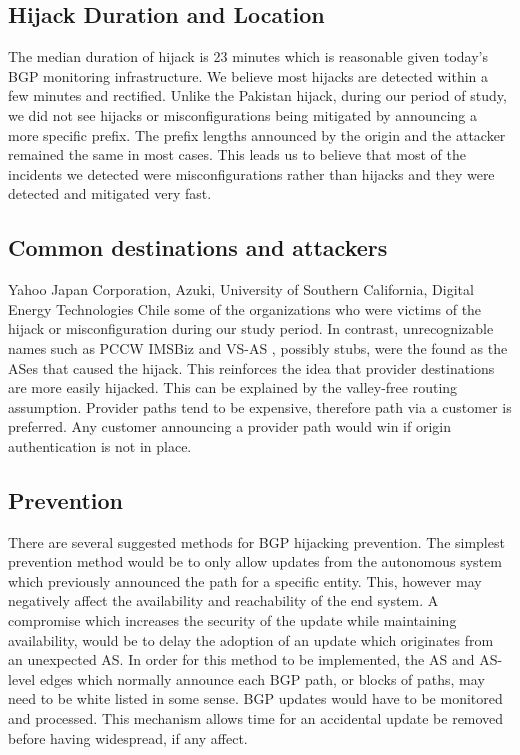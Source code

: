 \subsection{Hijack Duration and Location}
The median duration of hijack is 23 minutes which is reasonable given today's BGP monitoring infrastructure. We believe most hijacks are detected within a few minutes and rectified. Unlike the Pakistan hijack, during our period of study, we did not see hijacks or misconfigurations being mitigated by announcing a more specific prefix. The prefix lengths announced by the origin and the attacker remained the same in most cases. This leads us to believe that most of the incidents we detected were misconfigurations rather than hijacks and they were detected and mitigated very fast.
\subsection{Common destinations and attackers}
Yahoo Japan Corporation, Azuki, University of Southern California, Digital Energy Technologies Chile some of the organizations who were victims of the hijack or misconfiguration  during our study period. In contrast, unrecognizable names such as PCCW IMSBiz and VS-AS , possibly stubs, were the found as the ASes that caused the hijack. This reinforces the idea that provider destinations are more easily hijacked. This can be explained by the valley-free routing assumption. Provider paths tend to be expensive, therefore path via a customer is preferred. Any customer announcing a provider path would win if origin authentication is not in place.
\subsection{Prevention}
 There are several suggested methods for BGP hijacking prevention. The simplest prevention method would be to only allow updates from the autonomous system which previously announced the path for a specific entity. This, however may negatively affect the availability and reachability of the end system. A compromise which increases the security of the update while maintaining availability, would be to delay the adoption of an update which originates from an unexpected AS. In order for this method to be implemented, the AS and AS-level edges which normally announce each BGP path, or blocks of paths, may need to be white listed in some sense. BGP updates would have to be monitored and processed. This mechanism allows time for an accidental update be removed before having widespread, if any affect. 
 
